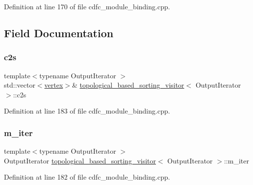 Definition at line 170 of file cdfc\+\_\+module\+\_\+binding.\+cpp.



\subsection{Field Documentation}
\mbox{\label{structtopological__based__sorting__visitor_a95d01b5231b8acf2c9bc7eeb2fc29ac7}} 
\subsubsection{\texorpdfstring{c2s}{c2s}}
{\footnotesize\ttfamily template$<$typename Output\+Iterator $>$ \\
std\+::vector$<$\hyperlink{graph_8hpp_abefdcf0544e601805af44eca032cca14}{vertex}$>$\& \hyperlink{structtopological__based__sorting__visitor}{topological\+\_\+based\+\_\+sorting\+\_\+visitor}$<$ Output\+Iterator $>$\+::c2s}



Definition at line 183 of file cdfc\+\_\+module\+\_\+binding.\+cpp.

\mbox{\label{structtopological__based__sorting__visitor_a15de11b0269d2fc090b7000ae77e41a4}} 
\subsubsection{\texorpdfstring{m\+\_\+iter}{m\_iter}}
{\footnotesize\ttfamily template$<$typename Output\+Iterator $>$ \\
Output\+Iterator \hyperlink{structtopological__based__sorting__visitor}{topological\+\_\+based\+\_\+sorting\+\_\+visitor}$<$ Output\+Iterator $>$\+::m\+\_\+iter}



Definition at line 182 of file cdfc\+\_\+module\+\_\+binding.\+cpp.

